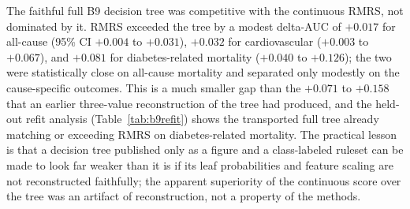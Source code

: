 \documentclass[11pt]{article}
\begin{document}
The faithful full B9 decision tree was competitive with the continuous RMRS, not dominated by it. RMRS exceeded the tree by a modest delta-AUC of $+0.017$ for all-cause (95\% CI $+0.004$ to $+0.031$), $+0.032$ for cardiovascular ($+0.003$ to $+0.067$), and $+0.081$ for diabetes-related mortality ($+0.040$ to $+0.126$); the two were statistically close on all-cause mortality and separated only modestly on the cause-specific outcomes. This is a much smaller gap than the $+0.071$ to $+0.158$ that an earlier three-value reconstruction of the tree had produced, and the held-out refit analysis (Table~\ref{tab:b9refit}) shows the transported full tree already matching or exceeding RMRS on diabetes-related mortality. The practical lesson is that a decision tree published only as a figure and a class-labeled ruleset can be made to look far weaker than it is if its leaf probabilities and feature scaling are not reconstructed faithfully; the apparent superiority of the continuous score over the tree was an artifact of reconstruction, not a property of the methods.
\end{document}
